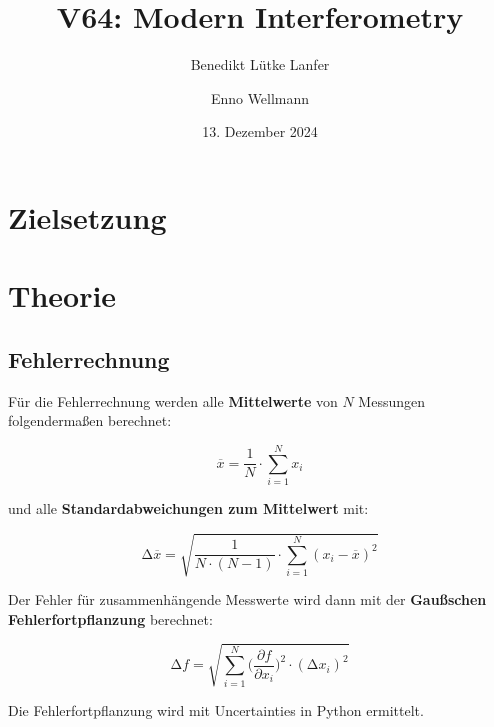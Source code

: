 

\title{V64: Modern Interferometry}
\author{Benedikt Lütke Lanfer \and Enno Wellmann}
\date{13. Dezember 2024}
\publishers{TU Dortmund – Fakultät Physik}


% 
\maketitle
\tableofcontents
\newpage


% 
\section{Zielsetzung}


\section{Theorie}

\subsection{Fehlerrechnung}
Für die Fehlerrechnung werden alle \textbf{Mittelwerte} von $N$ Messungen folgendermaßen berechnet:

\begin{equation}
    \overline{x} = \frac{1}{N} \cdot \sum_{i=1}^N x_i
    \label{eqn:Mittelwert}
\end{equation}

und alle \textbf{Standardabweichungen zum Mittelwert} mit:

\begin{equation}
    \increment\overline{x} = \sqrt{\frac{1}{N\cdot(N-1)}\cdot\sum_{i=1}^N (x_i-\overline{x})^2}
    \label{eqn:St_Mittelwert}
\end{equation}

Der Fehler für zusammenhängende Messwerte wird dann mit der \textbf{Gaußschen Fehlerfortpflanzung} berechnet:

\begin{equation}
    \increment{f} = \sqrt{ \sum_{i = 1}^{N}  \biggl(\frac{\partial{f}}{\partial{x_i}}\biggr)^2\cdot(\increment{x_i})^2}
    \label{eqn:Gauss}
\end{equation}

Die Fehlerfortpflanzung wird mit Uncertainties in Python \cite{uncertainties} ermittelt.

